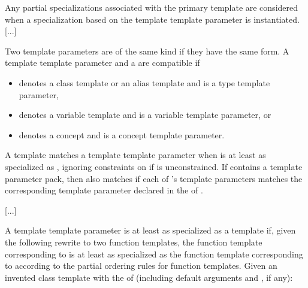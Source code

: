 \documentclass{wg21}
\begin{document}
\pnum
Any partial specializations associated with the
primary template are considered when a
specialization based on the template template parameter
is instantiated.
\textcolor{noteclr}{[...]}

\begin{addedblock}
Two template parameters are of the same kind if they have the same form.
A template template parameter  and a   are compatible if
\begin{itemize}
\item {} denotes a class template or an alias template and  is a type template parameter,
\item {} denotes a variable template and  is a variable template parameter, or
\item {} denotes a concept and  is a concept template parameter.
\end{itemize}
\end{addedblock}


\pnum
A template   matches a template
template parameter  when
  is at least as specialized as , ignoring constraints
on  if  is unconstrained.
If  contains a template parameter pack, then  also matches 
if each of 's template parameters
matches the corresponding template parameter declared in the
 of .

\textcolor{noteclr}{[...]}

\pnum
A template template parameter  is
at least as specialized as a template  
if, given the following rewrite to two function templates,
the function template corresponding to 
is at least as specialized as
the function template corresponding to 
according to the partial ordering rules
for function templates.
Given an invented class template 
with the  of  (including default arguments
and , if any):
\end{document}
